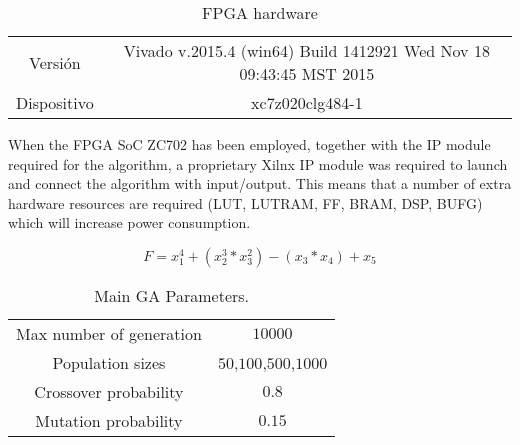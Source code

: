 
\begin{table}
\renewcommand{\arraystretch}{1.3}
\centering
\caption{FPGA hardware}
\label{Table:fpga}
\begin{tabular}{cc} \hline
  Versión & Vivado v.2015.4 (win64) Build 1412921 Wed Nov 18 09:43:45 MST 2015 \\ 
  Dispositivo & xc7z020clg484-1\\
\hline
\end{tabular}
\end{table}

When the FPGA SoC ZC702 has been employed, together with the IP module required for the algorithm, a proprietary Xilnx IP module was required to launch and connect the algorithm with input/output.  This means that a number of extra hardware resources are required (LUT, LUTRAM, FF, BRAM, DSP, BUFG) which will increase power consumption.  


\begin{equation}
\label{eq:fitness}
 F=x_{1}^{4} + (x_{2}^{3} * x_{3}^{2}) - (x_{3} * x_{4}) + x_{5} 
\end{equation}


\begin{table}
\renewcommand{\arraystretch}{1.3}
\centering
\caption{Main GA Parameters.}
\label{Table:par_genetico}
\begin{tabular}{cc}
\hline
Max number of generation & $10000$ \\
Population sizes & $50$,$100$,$500$,$1000$ \\
Crossover probability & $0.8$ \\ 
Mutation probability & $0.15$ \\ 
\hline
\end{tabular}
\end{table} 